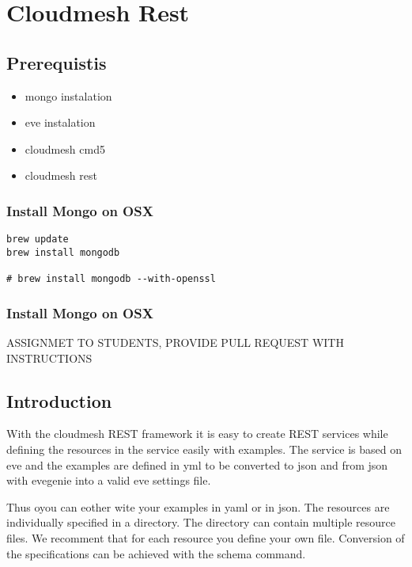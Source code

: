 \section{Cloudmesh Rest}\label{cloudmesh-rest}

\subsection{Prerequistis}\label{prerequistis}

\begin{itemize}
\tightlist
\item
  mongo instalation
\item
  eve instalation
\item
  cloudmesh cmd5
\item
  cloudmesh rest
\end{itemize}

\subsubsection{Install Mongo on OSX}\label{install-mongo-on-osx}

\begin{verbatim}
brew update
brew install mongodb

# brew install mongodb --with-openssl
\end{verbatim}

\subsubsection{Install Mongo on OSX}\label{install-mongo-on-osx-1}

ASSIGNMET TO STUDENTS, PROVIDE PULL REQUEST WITH INSTRUCTIONS

\subsection{Introduction}\label{introduction}

With the cloudmesh REST framework it is easy to create REST services
while defining the resources in the service easily with examples. The
service is based on eve and the examples are defined in yml to be
converted to json and from json with evegenie into a valid eve settings
file.

Thus oyou can eother wite your examples in yaml or in json. The
resources are individually specified in a directory. The directory can
contain multiple resource files. We recomment that for each resource you
define your own file. Conversion of the specifications can be achieved
with the schema command.

